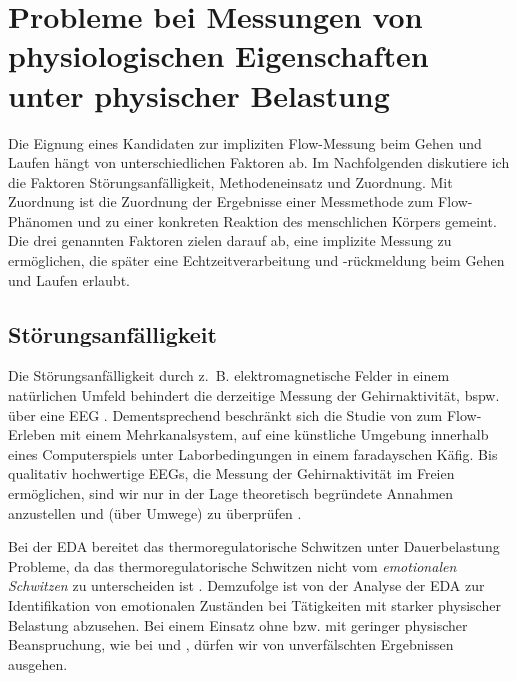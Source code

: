 
\section{Probleme bei Messungen von physiologischen Eigenschaften unter physischer Belastung} %
\label{sec:probleme_bei_messungen_von_physiologischen_eigenschaften_unter_physischer_belastung}

Die Eignung eines Kandidaten zur impliziten Flow-Messung beim Gehen und Laufen hängt von unterschiedlichen Faktoren ab. Im Nachfolgenden diskutiere ich die Faktoren Störungsanfälligkeit, Methodeneinsatz und Zuordnung. Mit Zuordnung ist die Zuordnung der Ergebnisse einer Messmethode zum Flow-Phänomen und zu einer konkreten Reaktion des menschlichen Körpers gemeint. Die drei genannten Faktoren zielen darauf ab, eine implizite Messung zu ermöglichen, die später eine Echtzeitverarbeitung und -rückmeldung beim Gehen und Laufen erlaubt.

\subsection{Störungsanfälligkeit} %
\label{sub:storungsanfalligkeit}

Die Störungsanfälligkeit durch z.~B. elektromagnetische Felder in einem natürlichen Umfeld behindert die derzeitige Messung der Gehirnaktivität, bspw. über eine \ac{EEG} \citep[][S.~56]{Henk2014}. Dementsprechend beschränkt sich die Studie von \citet{Hugentobler2011} zum Flow-Erleben mit einem Mehrkanalsystem, auf eine künstliche Umgebung innerhalb eines Computerspiels unter Laborbedingungen in einem faradayschen Käfig. Bis qualitativ hochwertige \acp{EEG}, die Messung der Gehirnaktivität im Freien ermöglichen, sind wir nur in der Lage theoretisch begründete Annahmen anzustellen und (über Umwege) zu überprüfen \citep[][S.~56]{Henk2014}.


Bei der EDA bereitet das thermoregulatorische Schwitzen unter Dauerbelastung Probleme, da das thermoregulatorische Schwitzen nicht vom \emph{emotionalen Schwitzen} zu unterscheiden ist \citep[][]{Baumeister2008}. Demzufolge ist von der Analyse der \ac{EDA} zur Identifikation von emotionalen Zuständen bei Tätigkeiten mit starker physischer Belastung abzusehen. Bei einem Einsatz ohne bzw. mit geringer physischer Beanspruchung, wie bei \citet{Kivikangas2006} und \citet{Nacke2008}, dürfen wir von unverfälschten Ergebnissen ausgehen.

